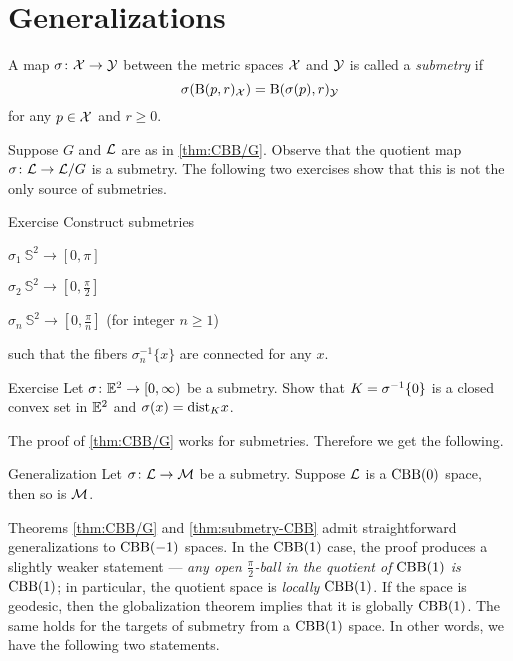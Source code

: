 \section{Generalizations}

A map $\sigma\colon\mathcal{X}\to\mathcal{Y}$ between the metric spaces $\mathcal{X}$ and $\mathcal{Y}$
is called a \emph{submetry} if 
\[\sigma(\mathrm{B}{}(p,r)_{\mathcal{X}})=\mathrm{B}{}(\sigma(p),r)_{\mathcal{Y}}\]
for any $p\in \mathcal{X}$ and $r\ge 0$.

Suppose $G$ and $\mathcal{L}$ are as in \ref{thm:CBB/G}.
Observe that the quotient map $\sigma\colon\mathcal{L}\to \mathcal{L}/G$ is a submetry.
The following two exercises show that this is not the only source of submetries. 

\begin{thm}{Exercise}\label{ex:sumbetries(S^2)}
Construct submetries
\begin{subthm}{}
$\sigma_1\:\mathbb{S}^2\to[0,\pi]$
\end{subthm}
\begin{subthm}{}
$\sigma_2\:\mathbb{S}^2\to[0,\tfrac\pi2]$
\end{subthm}
\begin{subthm}{}
$\sigma_n\:\mathbb{S}^2\to[0,\tfrac\pi n]$ (for integer $n\ge 1$)
\end{subthm}
such that the fibers $\sigma_n^{-1}\{x\}$ are connected for any $x$.
\end{thm}

\begin{thm}{Exercise}\label{ex:sumbetries(E^2)}
Let $\sigma\colon\mathbb{E}^2\to [0,\infty)$ be a submetry.
Show that $K\z=\sigma^{-1}\{0\}$ is a closed convex set in $\mathbb{E}^2$ and $\sigma(x)=\mathrm{dist}_Kx$.
\end{thm}

The proof of \ref{thm:CBB/G} works for submetries.
Therefore we get the following.

\begin{thm}{Generalization}\label{thm:submetry-CBB}
Let $\sigma\colon\mathcal{L}\to\mathcal{M}$ be a submetry.
Suppose $\mathcal{L}$ is a $\mathrm{CBB}(0)$ space, then so is $\mathcal{M}$.
\end{thm}

Theorems \ref{thm:CBB/G} and \ref{thm:submetry-CBB} admit straightforward generalizations to $\mathrm{CBB}(-1)$ spaces.
In the $\mathrm{CBB}(1)$ case, the proof produces a slightly weaker statement ---  \textit{any open $\tfrac\pi2$-ball in the quotient of $\mathrm{CBB}(1)$ is $\mathrm{CBB}(1)$};
in particular, the quotient space is \textit{locally} $\mathrm{CBB}(1)$.
If the space is geodesic, then the globalization theorem implies that it is globally  $\mathrm{CBB}(1)$.
The same holds for the targets of submetry from a  $\mathrm{CBB}(1)$ space.
In other words, we have the following two statements.

